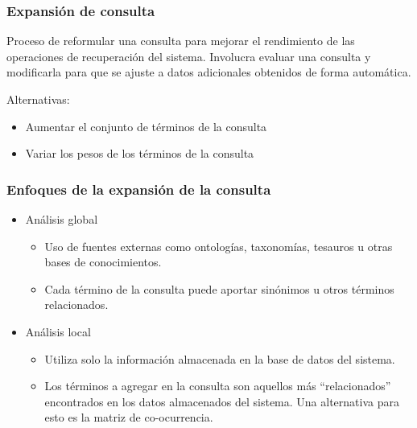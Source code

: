 \documentclass[
10pt, %
aspectratio=169, %
]{beamer}
\begin{document}
	\begin{frame}
		
		\frametitle{Expansión de consulta}
		
		\begin{alertblock}{}
			Proceso de reformular una consulta para mejorar el rendimiento de las operaciones de recuperación del sistema. Involucra evaluar una consulta y modificarla para que se ajuste a datos adicionales obtenidos de forma automática.
		\end{alertblock}
		
		\vspace{2\baselineskip}
		
		Alternativas: 
		\begin{itemize}
			\item Aumentar el conjunto de términos de la consulta
			\item Variar los pesos de los términos de la consulta			
		\end{itemize}		
		
	\end{frame}
	
	\begin{frame}
		
		\frametitle{Enfoques de la expansión de la consulta}
		
		\begin{itemize}
			
			\item Análisis global 
			\begin{itemize}
				\item Uso de fuentes externas como ontologías,  taxonomías, tesauros u otras bases de conocimientos.	
				\item Cada término de la consulta puede aportar sinónimos u otros términos relacionados.
			\end{itemize}
			
			\vspace{2\baselineskip}
			
			\item Análisis local 
			\begin{itemize}
				\item Utiliza solo la información almacenada en la base de datos del sistema.
				\item Los términos a agregar en la consulta son aquellos más ``relacionados'' encontrados en los datos almacenados del sistema. Una alternativa para esto es la matriz de co-ocurrencia.
			\end{itemize}
			
		\end{itemize}
		
	\end{frame}
	
\end{document}
